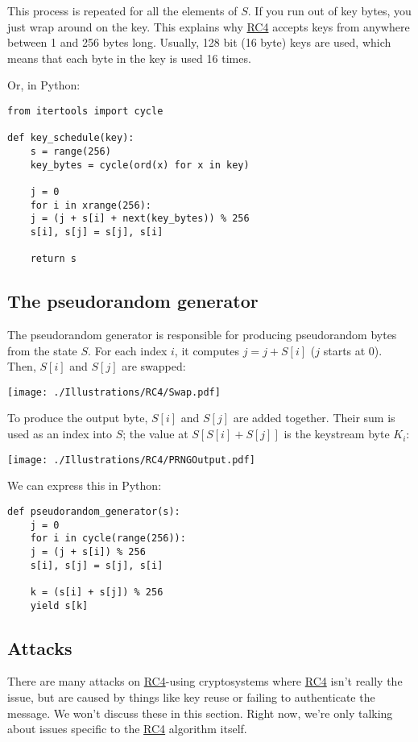 \documentclass[11pt,ebook,table,dvipsnames]{memoir}
\begin{document}
This process is repeated for all the elements of $S$. If you run out
of key bytes, you just wrap around on the key. This explains why \hyperref[RC4]{RC4}
accepts keys from anywhere between 1 and 256 bytes long. Usually, 128
bit (16 byte) keys are used, which means that each byte in the key is
used 16 times.

Or, in Python:

\begin{verbatim}
from itertools import cycle

def key_schedule(key):
    s = range(256)
    key_bytes = cycle(ord(x) for x in key)

    j = 0
    for i in xrange(256):
	j = (j + s[i] + next(key_bytes)) % 256
	s[i], s[j] = s[j], s[i]

    return s
\end{verbatim}
\subsection{The pseudorandom generator}
\label{sec-2-3-11-2}

The pseudorandom generator is responsible for producing pseudorandom
bytes from the state $S$. For each index $i$, it computes $j = j +
S[i]$ ($j$ starts at 0). Then, $S[i]$ and $S[j]$ are swapped:

\texttt{[image: ./Illustrations/RC4/Swap.pdf]}

To produce the output byte, $S[i]$ and $S[j]$ are added together.
Their sum is used as an index into $S$; the value at $S[S[i] + S[j]]$
is the keystream byte $K_i$:

\texttt{[image: ./Illustrations/RC4/PRNGOutput.pdf]}

We can express this in Python:

\begin{verbatim}
def pseudorandom_generator(s):
    j = 0
    for i in cycle(range(256)):
	j = (j + s[i]) % 256
	s[i], s[j] = s[j], s[i]

	k = (s[i] + s[j]) % 256
	yield s[k]
\end{verbatim}
\subsection{Attacks}
\label{sec-2-3-11-3}

There are many attacks on \hyperref[RC4]{RC4}-using cryptosystems where \hyperref[RC4]{RC4} isn't
really the issue, but are caused by things like key reuse or failing
to authenticate the message. We won't discuss these in this section.
Right now, we're only talking about issues specific to the \hyperref[RC4]{RC4}
algorithm itself.
\end{document}

